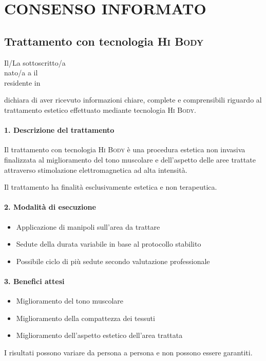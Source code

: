 
\section*{CONSENSO INFORMATO}

\subsection*{Trattamento con tecnologia \textsc{Hi Body}}

\noindent
Il/La sottoscritto/a \underline{\hspace{5cm}} \\
nato/a a \underline{\hspace{3cm}} il \underline{\hspace{3cm}} \\
residente in \underline{\hspace{8cm}}

\noindent
dichiara di aver ricevuto informazioni chiare, complete e comprensibili riguardo al trattamento estetico effettuato mediante tecnologia \textsc{Hi Body}.

\paragraph*{1. Descrizione del trattamento}
Il trattamento con tecnologia \textsc{Hi Body} è una procedura estetica non invasiva finalizzata al miglioramento del tono muscolare e dell'aspetto delle aree trattate attraverso stimolazione elettromagnetica ad alta intensità.

Il trattamento ha finalità esclusivamente estetica e non terapeutica.

\paragraph*{2. Modalità di esecuzione}
\begin{itemize}
    \item Applicazione di manipoli sull'area da trattare
    \item Sedute della durata variabile in base al protocollo stabilito
    \item Possibile ciclo di più sedute secondo valutazione professionale
\end{itemize}

\paragraph*{3. Benefici attesi}
\begin{itemize}
    \item Miglioramento del tono muscolare
    \item Miglioramento della compattezza dei tessuti
    \item Miglioramento dell'aspetto estetico dell'area trattata
\end{itemize}
I risultati possono variare da persona a persona e non possono essere garantiti.

